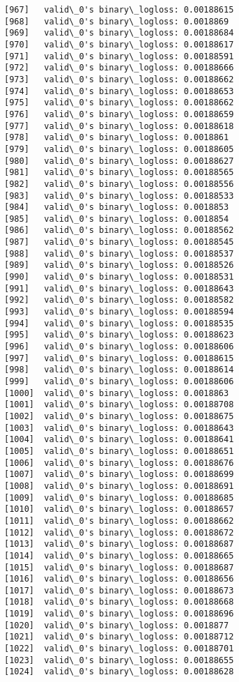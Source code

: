 \documentclass[11pt]{article}
\begin{document}
\begin{Verbatim}[commandchars=\\\{\}]
[967]	valid\_0's binary\_logloss: 0.00188615
[968]	valid\_0's binary\_logloss: 0.0018869
[969]	valid\_0's binary\_logloss: 0.00188684
[970]	valid\_0's binary\_logloss: 0.00188617
[971]	valid\_0's binary\_logloss: 0.00188591
[972]	valid\_0's binary\_logloss: 0.00188666
[973]	valid\_0's binary\_logloss: 0.00188662
[974]	valid\_0's binary\_logloss: 0.00188653
[975]	valid\_0's binary\_logloss: 0.00188662
[976]	valid\_0's binary\_logloss: 0.00188659
[977]	valid\_0's binary\_logloss: 0.00188618
[978]	valid\_0's binary\_logloss: 0.0018861
[979]	valid\_0's binary\_logloss: 0.00188605
[980]	valid\_0's binary\_logloss: 0.00188627
[981]	valid\_0's binary\_logloss: 0.00188565
[982]	valid\_0's binary\_logloss: 0.00188556
[983]	valid\_0's binary\_logloss: 0.00188533
[984]	valid\_0's binary\_logloss: 0.0018853
[985]	valid\_0's binary\_logloss: 0.0018854
[986]	valid\_0's binary\_logloss: 0.00188562
[987]	valid\_0's binary\_logloss: 0.00188545
[988]	valid\_0's binary\_logloss: 0.00188537
[989]	valid\_0's binary\_logloss: 0.00188526
[990]	valid\_0's binary\_logloss: 0.00188531
[991]	valid\_0's binary\_logloss: 0.00188643
[992]	valid\_0's binary\_logloss: 0.00188582
[993]	valid\_0's binary\_logloss: 0.00188594
[994]	valid\_0's binary\_logloss: 0.00188535
[995]	valid\_0's binary\_logloss: 0.00188623
[996]	valid\_0's binary\_logloss: 0.00188606
[997]	valid\_0's binary\_logloss: 0.00188615
[998]	valid\_0's binary\_logloss: 0.00188614
[999]	valid\_0's binary\_logloss: 0.00188606
[1000]	valid\_0's binary\_logloss: 0.0018863
[1001]	valid\_0's binary\_logloss: 0.00188708
[1002]	valid\_0's binary\_logloss: 0.00188675
[1003]	valid\_0's binary\_logloss: 0.00188643
[1004]	valid\_0's binary\_logloss: 0.00188641
[1005]	valid\_0's binary\_logloss: 0.00188651
[1006]	valid\_0's binary\_logloss: 0.00188676
[1007]	valid\_0's binary\_logloss: 0.00188699
[1008]	valid\_0's binary\_logloss: 0.00188691
[1009]	valid\_0's binary\_logloss: 0.00188685
[1010]	valid\_0's binary\_logloss: 0.00188657
[1011]	valid\_0's binary\_logloss: 0.00188662
[1012]	valid\_0's binary\_logloss: 0.00188672
[1013]	valid\_0's binary\_logloss: 0.00188687
[1014]	valid\_0's binary\_logloss: 0.00188665
[1015]	valid\_0's binary\_logloss: 0.00188687
[1016]	valid\_0's binary\_logloss: 0.00188656
[1017]	valid\_0's binary\_logloss: 0.00188673
[1018]	valid\_0's binary\_logloss: 0.00188668
[1019]	valid\_0's binary\_logloss: 0.00188696
[1020]	valid\_0's binary\_logloss: 0.0018877
[1021]	valid\_0's binary\_logloss: 0.00188712
[1022]	valid\_0's binary\_logloss: 0.00188701
[1023]	valid\_0's binary\_logloss: 0.00188655
[1024]	valid\_0's binary\_logloss: 0.00188628

\end{Verbatim}
\end{document}
